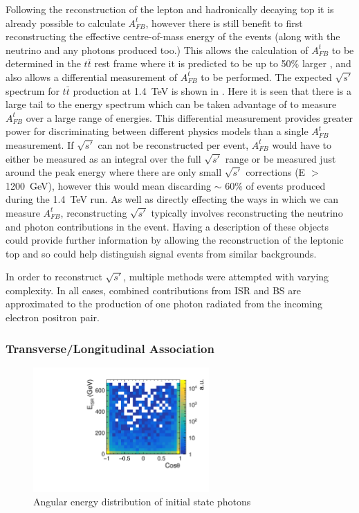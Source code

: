 Following the reconstruction of the lepton and hadronically decaying top it is already possible to calculate $A_{FB}^{t}$, however there is still benefit to first reconstructing the effective centre-of-mass energy of the events (along with the neutrino and any photons produced too.) This allows the calculation of $A_{FB}^{t}$ to be determined in the $t\bar{t}$ rest frame where it is predicted to be up to 50\% larger \cite{Krohn:2011tw}, and also allows a differential measurement of $A_{FB}^{t}$ to be performed. The expected $\sqrt{s'}$ spectrum for $t\bar{t}$ production at 1.4~TeV is shown in . Here it is seen that there is a large tail to the energy spectrum which can be taken advantage of to measure $A_{FB}^{t}$ over a large range of energies. This differential measurement provides greater power for discriminating between different physics models than a single $A_{FB}^{t}$ measurement. If $\sqrt{s'}$ can not be reconstructed per event, $A_{FB}^{t}$ would have to either be measured as an integral over the full $\sqrt{s'}$ range or be measured just around the peak energy where there are only small $\sqrt{s'}$ corrections (E $>$ 1200~GeV), however this would mean discarding $\sim$ 60\% of events produced during the 1.4~TeV run. As well as directly effecting the ways in which we can measure $A_{FB}^{t}$, reconstructing $\sqrt{s'}$ typically involves reconstructing the neutrino and photon contributions in the event. Having a description of these objects could provide further information by allowing the reconstruction of the leptonic top and so could help distinguish signal events from similar backgrounds.

In order to reconstruct $\sqrt{s'}$, multiple methods were attempted with varying complexity. In all cases, combined contributions from \ac{ISR} and \ac{BS} are approximated to the production of one photon radiated from the incoming electron positron pair.

\subsubsection{Transverse/Longitudinal Association}

\begin{figure}
  \centering
  \includegraphics[width=0.6\textwidth]{TopAnalysis/figures/ISRSpectrum.pdf}
  \caption[Angular energy distribution of initial state photons]{Angular energy distribution of initial state photons}
  \label{fig:photonspectrum}
\end{figure}



